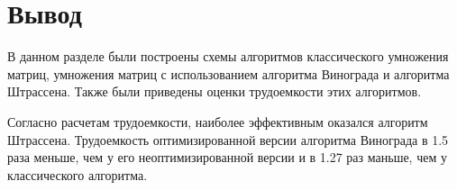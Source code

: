 %		
%		
%	
%	
%
%

\clearpage

\section*{Вывод}

В данном разделе были построены схемы алгоритмов классического умножения матриц, умножения матриц с использованием алгоритма Винограда и алгоритма Штрассена. Также были приведены оценки трудоемкости этих алгоритмов.

Согласно расчетам трудоемкости, наиболее эффективным оказался алгоритм Штрассена. Трудоемкость оптимизированной версии алгоритма Винограда в 1.5 раза меньше, чем у его неоптимизированной версии и в 1.27 раз маньше, чем у классического алгоритма. 


